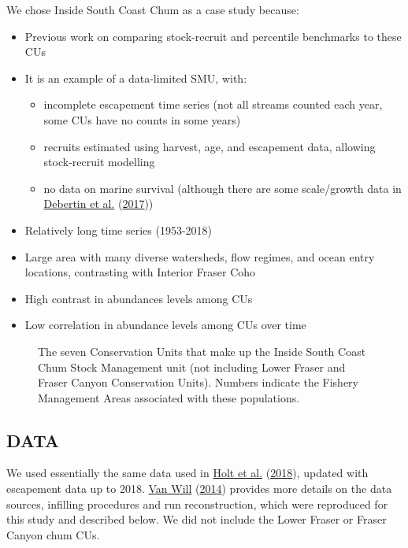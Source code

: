 \documentclass[11pt]{book}
\begin{document}
We chose Inside South Coast Chum as a case study because:
\begin{itemize}

\item
  Previous work on comparing stock-recruit and percentile benchmarks to these CUs
\item
  It is an example of a data-limited SMU, with:
  \begin{itemize}

  \item
    incomplete escapement time series (not all streams counted each year, some CUs have no counts in some years)
  \item
    recruits estimated using harvest, age, and escapement data, allowing stock-recruit modelling
  \item
    no data on marine survival (although there are some scale/growth data in \protect\hyperlink{ref-debertin_marine_2017}{Debertin et al.} (\protect\hyperlink{ref-debertin_marine_2017}{2017}))
  \end{itemize}
\item
  Relatively long time series (1953-2018)
\item
  Large area with many diverse watersheds, flow regimes, and ocean entry locations, contrasting with Interior Fraser Coho
\item
  High contrast in abundances levels among CUs
\item
  Low correlation in abundance levels among CUs over time
\end{itemize}
\begin{figure}[htb]

{\centering {} 

}

\caption{The seven Conservation Units that make up the Inside South Coast Chum Stock Management unit (not including Lower Fraser and Fraser Canyon Conservation Units). Numbers indicate the Fishery Management Areas associated with these populations.}\label{fig:chum-map}
\end{figure}
\hypertarget{data-2}{%
\subsection{DATA}\label{data-2}}

We used essentially the same data used in \protect\hyperlink{ref-holt_evaluating_2018}{Holt et al.} (\protect\hyperlink{ref-holt_evaluating_2018}{2018}), updated with escapement data up to 2018. \protect\hyperlink{ref-van_will_inner_2014}{Van Will} (\protect\hyperlink{ref-van_will_inner_2014}{2014}) provides more details on the data sources, infilling procedures and run reconstruction, which were reproduced for this study and described below. We did not include the Lower Fraser or Fraser Canyon chum CUs.
\end{document}
